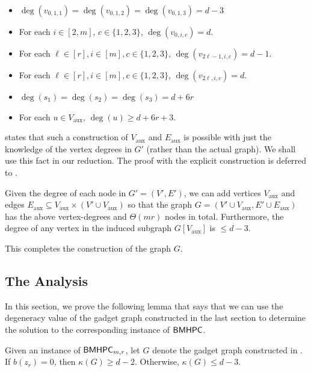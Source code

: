 \documentclass[11pt,letterpaper]{article}
\renewcommand{\geq}{\geqslant}
\renewcommand{\leq}{\leqslant}
\theoremstyle{definition}
\newcommand{\bmhpc}{\ensuremath{\textnormal{\textsf{BMHPC}}}\xspace}
\newcommand{\Vaux}{V_{\text{aux}}}
\newcommand{\Eaux}{E_{\text{aux}}}
\begin{document}
\begin{itemize}
    \item $\deg(v_{0,1,1})= \deg(v_{0,1,2}) = \deg(v_{0,1,3}) = d-3$ 
   \item For each $i\in [2,m]$, $c\in\{1,2,3\}$, $\deg(v_{0,i,c})=d$.
   \item For each $\ell\in [r], i\in [m], c\in \{1,2,3\}$, $\deg(v_{2\ell-1,i,c})=d-1$.
    \item For each $\ell\in [r], i\in [m], c\in \{1,2,3\}$, $\deg(v_{2\ell,i,c})=d$.
    \item $\deg(s_1)=\deg(s_2)=\deg(s_3)=d+6r$
    \item For each $u\in \Vaux$, $\deg(u)\geq d+6r+3$. 
\end{itemize}

 states that such a construction of $\Vaux$ and $\Eaux$ is possible with just the knowledge of the vertex degrees in $G'$ (rather than the actual graph). We shall use this fact in our reduction. The proof with the explicit construction is deferred to .

\begin{lemma}\label{lem:redn-aux-constr}
 Given the degree of each node in $G'=(V',E')$, we can add vertices $V_{\text{aux}}$ and edges $E_{\text{aux}}\subseteq \Vaux \times (V'\cup \Vaux)$ so that the graph $G=\left(V' \cup V_{\text{aux}}, E' \cup E_{\text{aux}}\right)$ has the above vertex-degrees and $\Theta(mr)$ nodes in total. Furthermore, the degree of any vertex in the induced subgraph $G[\Vaux]$ is $\leq d-3$.
\end{lemma}



This completes the construction of the graph $G$. 

\subsection{The Analysis}

In this section, we prove the following lemma that says that we can use the degeneracy value of the gadget graph constructed in the last section to determine the solution to the corresponding instance of \bmhpc. 

\begin{lemma}\label{lem:redn-degen-yesno}
     Given an instance of $\bmhpc_{m,r}$, let $G$ denote the gadget graph constructed in . If $b(z_r)=0$, then $\kappa(G)\geq d-2$. Otherwise, $\kappa(G)\leq d-3$.
\end{lemma}
\end{document}
